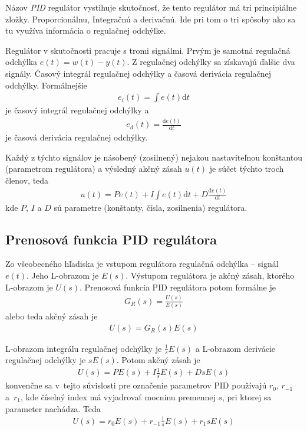 \documentclass[a4paper, 10pt, ]{article}
\begin{document}
Názov \emph{PID} regulátor vystihuje skutočnosť, že tento regulátor má tri principiálne zložky. Proporcionálnu, Integračnú a derivačnú. Ide pri tom o tri spôsoby ako sa tu využíva informácia o regulačnej odchýlke.

Regulátor v skutočnosti pracuje s tromi signálmi. Prvým je samotná regulačná odchýlka $e(t) = w(t) - y(t)$. Z regulačnej odchýlky sa získavajú ďalšie dva signály. Časový integrál regulačnej odchýlky a časová derivácia regulačnej odchýlky. Formálnejšie
\begin{align}
    e_i(t) = \int e(t) \text{d}t
\end{align}
je časový integrál regulačnej odchýlky a
\begin{align}
    e_d(t) = \frac{\text{d}e(t)}{\text{d}t}
\end{align}
je časová derivácia regulačnej odchýlky.

Každý z týchto signálov je násobený (zosilnený) nejakou nastaviteľnou konštantou (parametrom regulátora) a výsledný akčný zásah $u(t)$ je súčet týchto troch členov, teda
\begin{align}
    u(t) = P e(t) + I  \int e(t) \text{d}t + D  \frac{\text{d}e(t)}{\text{d}t}
\end{align}
kde $P$, $I$ a $D$ sú parametre (konštanty, čísla, zosilnenia) regulátora.





\subsection{Prenosová funkcia PID regulátora}

Zo všeobecného hľadiska je vstupom regulátora regulačná odchýlka -- signál $e(t)$. Jeho L-obrazom je $E(s)$. Výstupom regulátora je akčný zásah, ktorého L-obrazom je $U(s)$. Prenosová funkcia PID regulátora potom formálne je
\begin{align}
    G_R(s) = \frac{U(s)}{E(s)}
\end{align}
alebo teda akčný zásah je
\begin{align}
    U(s) = G_R(s) E(s)
\end{align}

L-obrazom integrálu regulačnej odchýlky je $\frac{1}{s} E(s)$ a L-obrazom derivácie regulačnej odchýlky je $sE(s)$. Potom akčný zásah je
\begin{align}
    U(s) = P E(s) + I  \frac{1}{s} E(s) + D  sE(s)
\end{align}
konvenčne sa v~tejto súvislosti pre označenie parametrov PID používajú $r_0$, $r_{-1}$ a~$r_1$, kde číselný index má vyjadrovať mocninu premennej $s$, pri ktorej sa parameter nachádza. Teda
\begin{align}
    U(s) = r_0 E(s) + r_{-1}  \frac{1}{s} E(s) + r_1  sE(s)
\end{align}
\end{document}
